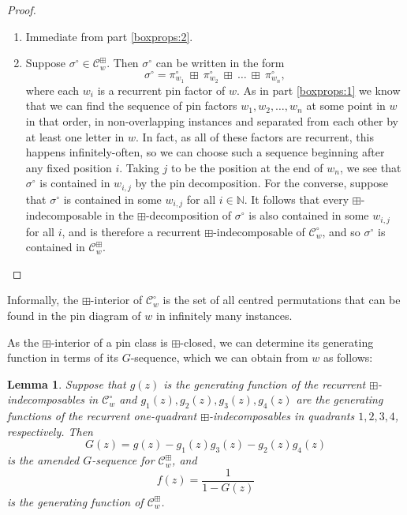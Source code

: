 \documentclass[11pt,a4paper]{article}
\newtheorem{lemma}[thm]{Lemma}
\theoremstyle{definition}
\begin{document}
\begin{proof}
\begin{enumerate}
\[\]
Hence $\mathcal{C}^{\boxplus}_{w}$ is a $\boxplus$-closed subclass of $\mathcal{C}^{\circ}_{w}$ which itself contains every $\boxplus$-closed subclass of $\mathcal{C}^{\circ}_{w}$ as a subclass, and the result follows.
\item Immediate from part \ref{boxprops:2}.
\item Suppose $\sigma^{\circ} \in \mathcal{C}^{\boxplus}_{w}$. Then $\sigma^{\circ}$ can be written in the form
\[
\sigma^{\circ} = \pi^{\circ}_{w_{1}} \ \boxplus \ \pi^{\circ}_{w_{2}} \ \boxplus \ \dots \ \boxplus \ \pi^{\circ}_{w_{n}},
\]
where each $w_{i}$ is a recurrent pin factor of $w$. As in part \ref{boxprops:1} we know that we can find the sequence of pin factors $w_{1}, w_{2}, \dots, w_{n}$ at some point in $w$ in that order, in non-overlapping instances and separated from each other by at least one letter in $w$. In fact, as all of these factors are recurrent, this happens infinitely-often, so we can choose such a sequence beginning after any fixed position $i$. Taking $j$ to be the position at the end of $w_{n}$, we see that $\sigma^{\circ}$ is contained in $w_{i,j}$ by the pin decomposition. For the converse, suppose that $\sigma^{\circ}$ is contained in some $w_{i,j}$ for all $i \in \mathbb{N}$. It follows that every $\boxplus$-indecomposable in the $\boxplus$-decomposition of $\sigma^{\circ}$ is also contained in some $w_{i,j}$ for all $i$, and is therefore a recurrent $\boxplus$-indecomposable of $\mathcal{C}^{\circ}_{w}$, and so $\sigma^{\circ}$ is contained in $\mathcal{C}^{\boxplus}_{w}$. \qedhere
\end{enumerate}
\end{proof}

Informally, the $\boxplus$-interior of $\mathcal{C}^{\circ}_{w}$ is the set of all centred permutations that can be found in the pin diagram of $w$ in infinitely many instances.

As the $\boxplus$-interior of a pin class is $\boxplus$-closed, we can determine its generating function in terms of its $G$-sequence, which we can obtain from $w$ as follows:

\begin{lemma} \label{lemma:boxgenfunction}
Suppose that $g(z)$ is the generating function of the recurrent $\boxplus$-indecomposables in $\mathcal{C}^{\circ}_{w}$ and $g_{1}(z), g_{2}(z), g_{3}(z), g_{4}(z)$ are the generating functions of the recurrent one-quadrant $\boxplus$-indecomposables in quadrants $1,2,3,4$, respectively. Then
\[
G(z) = g(z) - g_{1}(z)g_{3}(z) - g_{2}(z)g_{4}(z)
\]
is the amended $G$-sequence for $\mathcal{C}^{\boxplus}_{w}$, and 
\[
f(z) = \frac{1}{1 - G(z)}
\]
is the generating function of $\mathcal{C}^{\boxplus}_{w}$.
\end{lemma}
\end{document}
